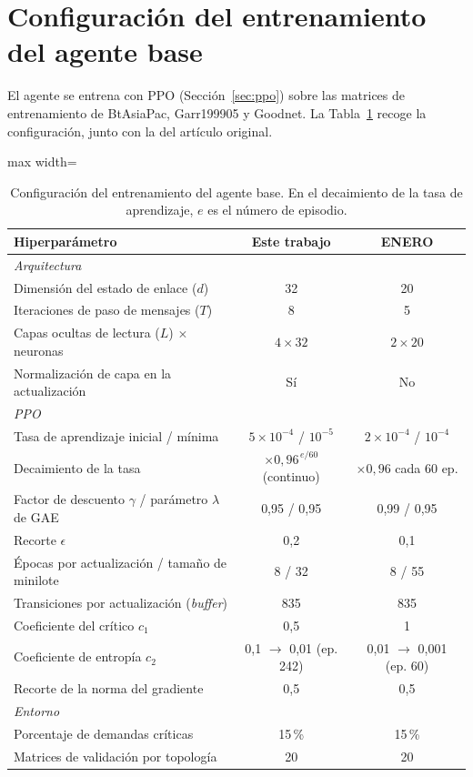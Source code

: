 \section{Configuración del entrenamiento del agente base}\label{sec:hiperparametros_base}

El agente se entrena con PPO (Sección~\ref{sec:ppo}) sobre las matrices de entrenamiento de BtAsiaPac, Garr199905 y Goodnet. La Tabla~\ref{tab:hiperparametros} recoge la configuración, junto con la del artículo original.

\begin{table}[H]
	\centering
	\small
	\begin{adjustbox}{max width=\textwidth}
	\begin{tabular}{p{6.2cm}cc}
		\toprule
		\textbf{Hiperparámetro} & \textbf{Este trabajo} & \textbf{ENERO \cite{ALMASAN2022109166}} \\
		\midrule
		\multicolumn{3}{l}{\textit{Arquitectura}} \\
		Dimensión del estado de enlace ($d$) & 32 & 20 \\
		Iteraciones de paso de mensajes ($T$) & 8 & 5 \\
		Capas ocultas de lectura ($L$) $\times$ neuronas & $4 \times 32$ & $2 \times 20$ \\
		Normalización de capa en la actualización & Sí & No \\
		\midrule
		\multicolumn{3}{l}{\textit{PPO}} \\
		Tasa de aprendizaje inicial / mínima & $5\times10^{-4}$ / $10^{-5}$ & $2\times10^{-4}$ / $10^{-4}$ \\
		Decaimiento de la tasa & $\times 0{,}96^{\,e/60}$ (continuo) & $\times 0{,}96$ cada 60 ep. \\
		Factor de descuento $\gamma$ / parámetro $\lambda$ de GAE & 0,95 / 0,95 & 0,99 / 0,95 \\
		Recorte $\epsilon$ & 0,2 & 0,1 \\
		Épocas por actualización / tamaño de minilote & 8 / 32 & 8 / 55 \\
		Transiciones por actualización (\textit{buffer}) & 835 & 835 \\
		Coeficiente del crítico $c_1$ & 0,5 & 1 \\
		Coeficiente de entropía $c_2$ & 0,1 $\rightarrow$ 0,01 (ep. 242) & 0,01 $\rightarrow$ 0,001 (ep. 60) \\
		Recorte de la norma del gradiente & 0,5 & 0,5 \\
		\midrule
		\multicolumn{3}{l}{\textit{Entorno}} \\
		Porcentaje de demandas críticas & 15\,\% & 15\,\% \\
		Matrices de validación por topología & 20 & 20 \\
		\bottomrule
	\end{tabular}
	\end{adjustbox}
	\caption[Configuración del entrenamiento del agente base]{Configuración del entrenamiento del agente base. En el decaimiento de la tasa de aprendizaje, $e$ es el número de episodio.}
	\label{tab:hiperparametros}
\end{table}

